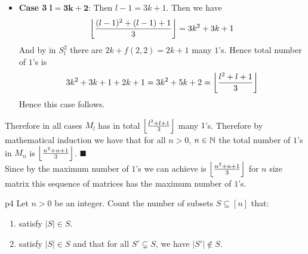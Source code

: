 \documentclass[a4paper, 11pt]{article}
\renewenvironment{proof}{\noindent{\it \textbf{Proof:}}\hspace*{1em}}{\hfill $\blacksquare$\bigskip\\}
\begin{document}
{\begin{proof}
\begin{itemize}[label=$\bullet$]
		\item \textbf{Case 3} $\boldsymbol{l=3k+2}$: Then $l-1=3k+1$. Then we have $$\left\lfloor \frac{(l-1)^2+(l-1)+1}{3}\right\rfloor=3k^2+3k+1$$And by  in $S_l^2$ there are $2k+f(2,2)=2k+1$ many $1$'s. Hence total number of $1$'s is $$3k^2+3k+1+2k+1=3k^2+5k+2=\left\lfloor \frac{l^2+l+1}{3}\right\rfloor$$Hence this case follows.
	\end{itemize}
	Therefore in all cases $M_l$ has in total $\left\lfloor \frac{l^2+l+1}{3}\right\rfloor$ many $1$'s. Therefore by mathematical induction we have that for all $n>0$, $n\in\mathbb{N}$ the total number of $1$'s in $M_n$ is $\left\lfloor \frac{n^2+n+1}{3}\right\rfloor$.
\end{proof}
Since by  the maximum number of $1$'s we can achieve is $\left\lfloor \frac{n^2+n+1}{3}\right\rfloor$ for $n$ size matrix this sequence of matrices has the maximum number of $1$'s. 
}



\begin{problem}{%
	}{p4%
	}
Let $n>0$ be an integer. Count the number of subsets $S\subseteq [n]$ that:\begin{enumerate}[label=(\alph*)]
	\item satisfy $|S|\in S$.
	\item satisfy $|S|\in S$ and that for all $S'\subsetneq S$, we have $|S'|\notin S$.
\end{enumerate}
\end{problem}
\end{document}
